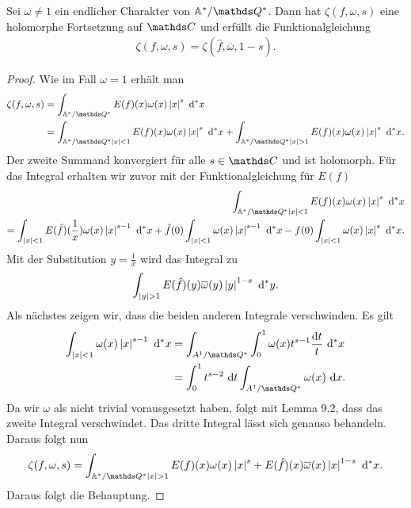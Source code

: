 \begin{thm}
Sei $\omega \not =1$ ein endlicher Charakter von $\A^\ast/\Q^\ast$.
Dann hat $\zeta(f,\omega,s)$ eine holomorphe Fortsetzung auf $\C$ und erfüllt die Funktionalgleichung
\begin{align*}
\zeta(f,\omega,s)=\zeta(\hat{f},\overline{\omega},1-s).
\end{align*}
\end{thm}
\begin{proof}
Wie im Fall $\omega=1$ erhält man
\begin{align*}
\zeta(f,\omega,s)&=\int_{\A^\ast/\Q^\ast} E(f)(x)\omega(x)\abs{x}^s~\mathrm{d}^\ast x\\
&=\int_{\A^\ast/\Q^\ast \abs{x}<1} E(f)(x)\omega(x)\abs{x}^s~\mathrm{d}^\ast x +\int_{\A^\ast/\Q^\ast \abs{x}>1} E(f)(x)\omega(x)\abs{x}^s~\mathrm{d}^\ast x.
\end{align*}
Der zweite Summand konvergiert für alle $s\in \C$ und ist holomorph.
Für das Integral erhalten wir zuvor mit der Funktionalgleichung für $E(f)$
\begin{align*}
\int_{\A^\ast/\Q^\ast \abs{x}<1} E(f)(x)\omega(x)\abs{x}^s~\mathrm{d}^\ast x \\
=\int_{\abs{x}<1} E(\hat{f})(\frac{1}{x})\omega(x)\abs{x}^{s-1}~\mathrm{d}^\ast x + \hat{f}(0)\int_{\abs{x}<1} \omega(x)\abs{x}^{s-1}~\mathrm{d}^\ast x - f(0) \int_{\abs{x}<1} \omega(x) \abs{x}^s~\mathrm{d}^\ast x.
\end{align*}
Mit der Substitution $y=\frac{1}{x}$ wird das Integral zu
\begin{align*}
\int_{\left\vert y\right\vert>1} E(\hat{f})(y)\overline{\omega}(y)\left\vert y\right\vert^{1-s} ~\mathrm{d}^\ast y.
\end{align*}
Als nächstes zeigen wir, dass die beiden anderen Integrale verschwinden. Es gilt
\begin{align*}
\int_{\abs{x}<1}\omega(x)\abs{x}^{s-1}~\mathrm{d}^\ast x&=\int_{A^1/\Q^\ast} \int_0^1 \omega(x)t^{s-1} \frac{\mathrm{d}t}{t}~\mathrm{d}^\ast x\\
&=\int_0^1 t^{s-2}~\mathrm{d}t \int_{A^1/\Q^\ast} \omega(x)~\mathrm{d}x.
\end{align*}
Da wir $\omega$ als nicht trivial vorausgesetzt haben, folgt mit Lemma 9.2, dass das zweite Integral verschwindet.
Das dritte Integral lässt sich genauso behandeln.
Daraus folgt nun
\begin{align*}
\zeta(f,\omega,s)=\int_{\A^\ast/\Q^\ast \abs{x}>1} E(f)(x)\omega(x)\abs{x}^s +E(\hat{f})(x)\overline{\omega}(x)\abs{x}^{1-s}~\mathrm{d}^\ast x.
\end{align*}
Daraus folgt die Behauptung.
\end{proof}


